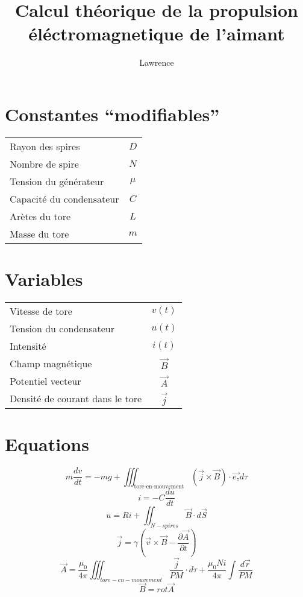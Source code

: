 \documentclass[paper=a4]{scrartcl}
\title{Calcul théorique de la propulsion éléctromagnetique de l'aimant}
\author{Lawrence}
\begin{document}
\maketitle
\section*{Constantes ``modifiables''}
\begin{table}[h]
\begin{tabular}{lc}
\toprule
Rayon des spires & \(D\)\\
Nombre de spire & \(N\)\\
Tension du générateur & \(\mu\)\\
Capacité du condensateur & \(C\)\\
Arètes du tore & \(L\)\\
Masse du tore & \(m\)\\
\bottomrule
\end{tabular}
\end{table}
\section*{Variables}
\begin{table}[h]
\begin{tabular}{lc}
\toprule
Vitesse de tore & \(v(t)\)\\
Tension du condensateur & \(u(t)\)\\
Intensité & \(i(t)\)\\
Champ magnétique & \(\vec{B}\)\\
Potentiel vecteur & \(\vec{A}\)\\
Densité de courant dans le tore & \(\vec{j}\)\\
\bottomrule
\end{tabular}
\end{table}
\section*{Equations}
\begin{equation}
\boxed{
m \frac{dv}{dt} = -mg + \iiint_{
\textrm{tore-en-mouvement}} (\vec{j} \times \vec{B}) \cdot \vec{e_z
}d\tau
}
\label{m}
\end{equation}
\begin{equation}
i = -C \frac{du}{dt}
\label{i}
\end{equation}
\begin{equation}
u = Ri + \iint_{N-spires} \vec{B} \cdot d\vec{S}
\label{u}
\end{equation}
\begin{equation}
\vec{j} = \gamma \left(
\vec{v} \times \vec{B} - \frac{\partial\vec{A}}{\partial t}
\right)
\label{j}
\end{equation}
\begin{equation}
\vec{A} = \frac{\mu_0}{4\pi} \iiint_{tore-en-mouvement} \frac{\vec{j}}{PM}
\cdot d\tau + \frac{\mu_0 Ni}{4\pi} \int\frac{d\vec{r}}{PM}
\label{A}
\end{equation}
\begin{equation}
\vec{B} = rot\vec{A}
\label{B}
\end{equation}
\end{document}
